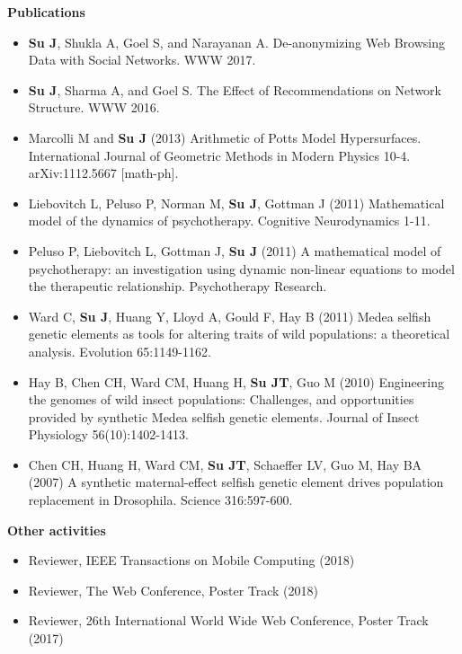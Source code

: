 \documentclass[letterpaper,10pt]{article}
\newcommand{\resheading}[1]{{\large \colorbox{mygrey}{\begin{minipage}{\textwidth}{\textbf{#1 \vphantom{p\^{E}}}}\end{minipage}}}}
\begin{document}
\resheading{Publications}
\begin{itemize}
\item \textbf{Su J}, Shukla A, Goel S, and Narayanan A.  De-anonymizing Web Browsing Data with Social Networks.  WWW 2017.
  \item \textbf{Su J}, Sharma A, and Goel S.  The Effect of Recommendations on Network Structure.  WWW 2016.
	\item Marcolli M and \textbf{Su J} (2013) Arithmetic of Potts Model Hypersurfaces.  International Journal of Geometric Methods in Modern Physics 10-4.  arXiv:1112.5667 [math-ph].
	\item Liebovitch L, Peluso P, Norman M, \textbf{Su J}, Gottman J (2011) Mathematical model of the dynamics of psychotherapy.  Cognitive Neurodynamics 1-11.
	\item Peluso P, Liebovitch L, Gottman J, \textbf{Su J} (2011) A mathematical model of psychotherapy: an investigation using dynamic non-linear equations to model the therapeutic relationship.  Psychotherapy Research.
	\item Ward C, \textbf{Su J}, Huang Y, Lloyd A, Gould F, Hay B (2011) Medea selfish genetic elements as tools for altering traits of wild populations: a theoretical analysis.  Evolution 65:1149-1162.
	\item Hay B, Chen CH, Ward CM, Huang H, \textbf{Su JT}, Guo M (2010) Engineering the genomes of wild insect populations: Challenges, and opportunities provided by synthetic Medea selfish genetic elements.  Journal of Insect Physiology 56(10):1402-1413.
	\item Chen CH, Huang H, Ward CM, \textbf{Su JT}, Schaeffer LV, Guo M, Hay BA (2007) A synthetic maternal-effect selfish genetic element drives population replacement in Drosophila. Science 316:597-600.
\end{itemize}

\resheading{Other activities}
\begin{itemize}
\item Reviewer, IEEE Transactions on Mobile Computing (2018)
\item Reviewer, The Web Conference, Poster Track (2018)
\item Reviewer, 26th International World Wide Web Conference, Poster Track (2017)
\end{itemize}
\end{document}
